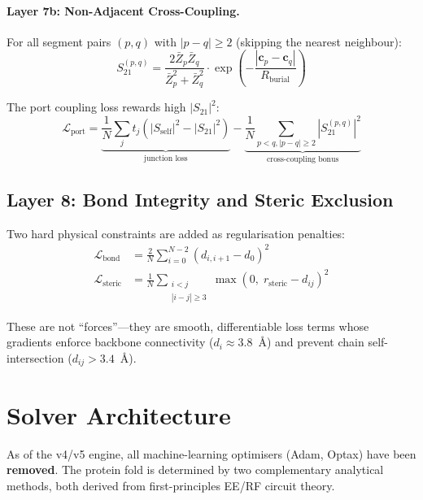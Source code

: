 \paragraph{Layer 7b: Non-Adjacent Cross-Coupling.}
For all segment pairs $(p, q)$ with $|p - q| \geq 2$ (skipping the nearest neighbour):
\begin{equation}
    S_{21}^{(p,q)} = \frac{2\bar{Z}_p \bar{Z}_q}{\bar{Z}_p^2 + \bar{Z}_q^2} \cdot \exp\!\left(-\frac{|\mathbf{c}_p - \mathbf{c}_q|}{R_\text{burial}}\right)
    \label{eq:cross_s21}
\end{equation}

The port coupling loss rewards high $|S_{21}|^2$:
\begin{equation}
    \mathcal{L}_\text{port} = \underbrace{\frac{1}{N}\sum_j t_j(|S_\text{self}|^2 - |S_{21}|^2)}_{\text{junction loss}} - \underbrace{\frac{1}{N}\sum_{p<q, |p-q|\geq 2} |S_{21}^{(p,q)}|^2}_{\text{cross-coupling bonus}}
    \label{eq:port_loss}
\end{equation}

\subsection{Layer 8: Bond Integrity and Steric Exclusion}

Two hard physical constraints are added as regularisation penalties:
\begin{align}
    \mathcal{L}_\text{bond}    &= \frac{2}{N} \sum_{i=0}^{N-2} (d_{i,i+1} - d_0)^2 \label{eq:bond_penalty} \\
    \mathcal{L}_\text{steric}  &= \frac{1}{N} \sum_{\substack{i < j \\ |i-j| \geq 3}} \max(0,\; r_\text{steric} - d_{ij})^2 \label{eq:steric_penalty}
\end{align}

These are not ``forces''---they are smooth, differentiable loss terms whose gradients enforce backbone connectivity ($d_i \approx 3.8$~\AA) and prevent chain self-intersection ($d_{ij} > 3.4$~\AA).

\section{Solver Architecture}
\label{sec:solver_architecture}

As of the v4/v5 engine, all machine-learning optimisers (Adam, Optax) have been \textbf{removed}.  The protein fold is determined by two complementary analytical methods, both derived from first-principles EE/RF circuit theory.

